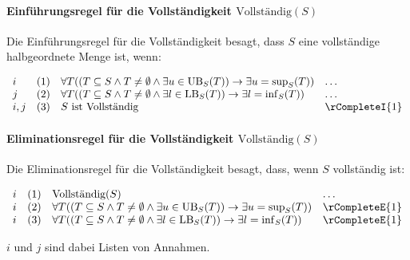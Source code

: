 \documentclass[main.tex]{subfiles}
\begin{document}
\paragraph{Einführungsregel für die Vollständigkeit \(\text{Vollständig}(S)\)}
Die Einführungsregel für die Vollständigkeit besagt, dass \( S \) eine vollständige halbgeordnete Menge ist, wenn:

\[
\begin{array}{llll}
    i   & (1) & \forall T((T\subseteq S\land T \neq \emptyset\land \exists u \in \text{UB}_S(T)) \rightarrow \exists u = \sup_S(T)) & \dots \\
    j   & (2) & \forall T((T\subseteq S\land T \neq \emptyset\land \exists l \in \text{LB}_S(T)) \rightarrow \exists l = \inf_S(T)) & \dots \\
    i,j & (3) & S \text{ ist Vollständig} & \rCompleteI{1}
\end{array}
\]

\paragraph{Eliminationsregel für die Vollständigkeit \(\text{Vollständig}(S)\)}
Die Eliminationsregel für die Vollständigkeit besagt, dass, wenn \( S \) vollständig ist:

\[
\begin{array}{llll}
    i & (1) & \text{Vollständig}(S) & \dots \\
    i & (2) & \forall T((T\subseteq S\land T \neq \emptyset\land \exists u \in \text{UB}_S(T)) \rightarrow \exists u = \sup_S(T)) & \rCompleteE{1} \\
    i & (3) & \forall T((T\subseteq S\land T \neq \emptyset\land \exists l \in \text{LB}_S(T)) \rightarrow \exists l = \inf_S(T)) & \rCompleteE{1}
\end{array}
\]

\(i\) und \(j\) sind dabei Listen von Annahmen.
\end{document}
